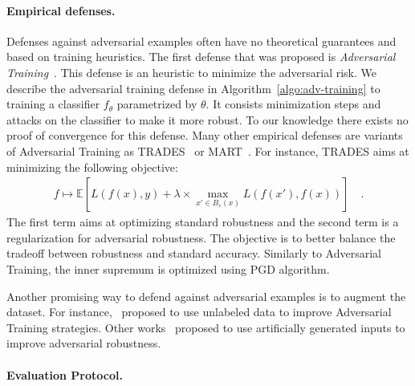 \paragraph{Empirical defenses.} Defenses against adversarial examples often have no theoretical guarantees and based on training heuristics. The first defense that was proposed is \emph{Adversarial Training}~\citep{goodfellow2014explaining,madry2017towards}. This defense is an heuristic to minimize the adversarial risk. We describe the adversarial training defense in Algorithm~\ref{algo:adv-training} to training a classifier $f_\theta$ parametrized by $\theta$. It consists minimization steps and attacks on the classifier to make it more robust. To our knowledge there exists no proof of convergence for this defense. Many other empirical defenses are variants of Adversarial Training as TRADES~\citep{zhang2019theoretically} or MART~\citep{wang2019improving}. For instance, TRADES aims at minimizing the following objective:
\begin{align*}
  f\mapsto\mathbb{E}\left[L(f(x),y)+\lambda\times\max_{x'\in B_\varepsilon(x)}L(f(x'),f(x))\right]\quad.
\end{align*}
The first term aims at optimizing standard robustness and the second term is a regularization for adversarial robustness. The objective is to better balance the tradeoff between robustness and standard accuracy. Similarly to Adversarial Training, the inner supremum is optimized using PGD algorithm.

Another promising way to defend against adversarial examples is to augment the dataset. For instance,~\cite{carmon2019unlabeled,rebuffi2021fixing} proposed to use unlabeled data to improve Adversarial Training strategies. Other works~\citep{wang2019improving,xxx} proposed to use artificially generated inputs to improve adversarial robustness. 



\paragraph{Evaluation Protocol.}

